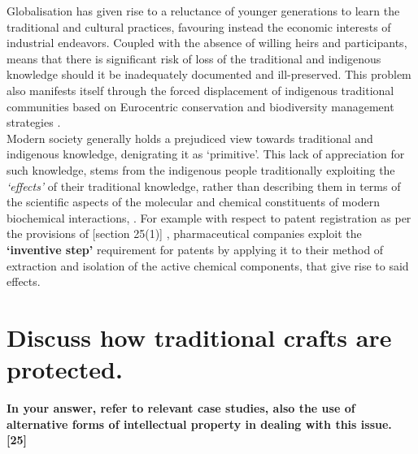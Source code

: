 \documentclass[11pt]{article}
\begin{document}
Globalisation has given rise to a reluctance of younger generations to learn the
traditional and cultural practices, favouring instead the economic interests of
industrial endeavors. Coupled with the absence of willing heirs and
participants, means that there is significant risk of loss of the traditional
and indigenous knowledge should it be inadequately documented and ill-preserved.
This problem also manifests itself through the forced displacement of indigenous
traditional communities based on Eurocentric conservation and biodiversity
management strategies \cite{simelane09_african_trad_knowl_sys_biodiv_manag}.\\

Modern society generally holds a prejudiced view towards traditional and
indigenous knowledge, denigrating it as `primitive'. This lack of appreciation
for such knowledge, stems from the indigenous people traditionally exploiting
the \emph{`effects'} of their traditional knowledge, rather than describing them in
terms of the scientific aspects of the molecular and chemical constituents of
modern biochemical interactions, \cite{amechi15_leverag_trad_knowl_medicinal}.
For example with respect to patent registration as per the provisions of
[section 25(1)] \cite{rsa78_patents_act}, pharmaceutical companies exploit the
\textbf{`inventive step'} requirement for patents by applying it to their method of
extraction and isolation of the active chemical components, that give rise to
said effects.

\section{Discuss how traditional crafts are protected.}
\label{sec:org527e54b}

\textbf{In your answer, refer to relevant case studies, also the use of alternative
forms of intellectual property in dealing with this issue. [25]}\\
\end{document}
